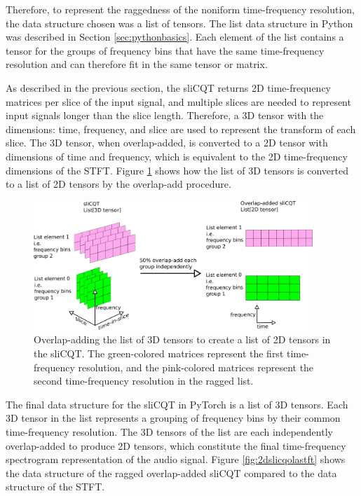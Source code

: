 \documentclass[report.tex]{subfiles}
\begin{document}
Therefore, to represent the raggedness of the noniform time-frequency resolution, the data structure chosen was a list of tensors. The list data structure in Python was described in Section \ref{sec:pythonbasics}. Each element of the list contains a tensor for the groups of frequency bins that have the same time-frequency resolution and can therefore fit in the same tensor or matrix.

As described in the previous section, the sliCQT returns 2D time-frequency matrices per slice of the input signal, and multiple slices are needed to represent input signals longer than the slice length. Therefore, a 3D tensor with the dimensions: time, frequency, and slice are used to represent the transform of each slice. The 3D tensor, when overlap-added, is converted to a 2D tensor with dimensions of time and frequency, which is equivalent to the 2D time-frequency dimensions of the STFT. Figure \ref{fig:3dslicqola2d} shows how the list of 3D tensors is converted to a list of 2D tensors by the overlap-add procedure.

\begin{figure}[ht]
	\centering
	\includegraphics[width=0.9375\textwidth]{./images-blockdiagrams/3dslicqola2d.png}
	\caption{Overlap-adding the list of 3D tensors to create a list of 2D tensors in the sliCQT. The green-colored matrices represent the first time-frequency resolution, and the pink-colored matrices represent the second time-frequency resolution in the ragged list.}
	\label{fig:3dslicqola2d}
\end{figure}

The final data structure for the sliCQT in PyTorch is a list of 3D tensors. Each 3D tensor in the list represents a grouping of frequency bins by their common time-frequency resolution. The 3D tensors of the list are each independently overlap-added to produce 2D tensors, which constitute the final time-frequency spectrogram representation of the audio signal. Figure \ref{fig:2dslicqolastft} shows the data structure of the ragged overlap-added sliCQT compared to the data structure of the STFT.
\end{document}
